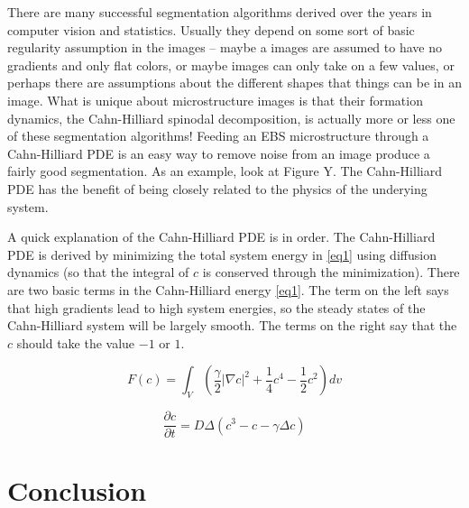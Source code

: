 \documentclass[11pt]{article}
\begin{document}
There are many successful segmentation algorithms derived over the years in computer vision and statistics. Usually they depend on some sort of basic regularity assumption in the images -- maybe a images are assumed to have no gradients and only flat colors, or maybe images can only take on a few values, or perhaps there are assumptions about the different shapes that things can be in an image. What is unique about microstructure images is that their formation dynamics, the Cahn-Hilliard spinodal decomposition, is actually more or less one of these segmentation algorithms! Feeding an EBS microstructure through a Cahn-Hilliard PDE is an easy way to remove noise from an image produce a fairly good segmentation. As an example, look at Figure Y. The Cahn-Hilliard PDE has the benefit of being closely related to the physics of the underying system.

A quick explanation of the Cahn-Hilliard PDE is in order. The Cahn-Hilliard PDE is derived by minimizing the total system energy in \ref{eq1} using diffusion dynamics (so that the integral of $c$ is conserved through the minimization). There are two basic terms in the Cahn-Hilliard energy \ref{eq1}. The term on the left says that high gradients lead to high system energies, so the steady states of the Cahn-Hilliard system will be largely smooth. The terms on the right say that the $c$ should take the value $-1$ or $1$.

\begin{equation}
F(c) = \int_{V} \left ( \frac{\gamma}{2}\left | \nabla c \right |^2 + \frac{1}{4} c^4 - \frac{1}{2} c^2 \right ) d v
\label{eq1}
\end{equation}

\begin{equation}
\frac{\partial c}{\partial t} = D \Delta \left ( c^3 - c - \gamma \Delta c \right )
\label{eq2}
\end{equation}

\section{Conclusion}
\end{document}
